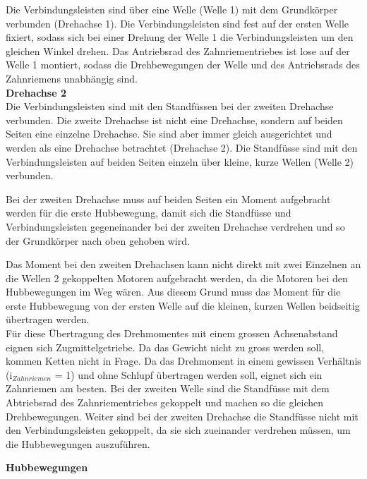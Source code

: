 Die Verbindungsleisten sind über eine Welle (Welle 1) mit dem Grundkörper verbunden (Drehachse 1). Die Verbindungsleisten sind fest auf der ersten Welle fixiert, sodass sich bei einer Drehung der Welle 1 die Verbindungsleisten um den gleichen Winkel drehen. Das Antriebsrad des Zahnriementriebes ist lose auf der Welle 1 montiert, sodass die Drehbewegungen der Welle und des Antriebsrads des Zahnriemens unabhängig sind.\\

\textbf{Drehachse 2}\\

Die Verbindungsleisten sind mit den Standfüssen bei der zweiten Drehachse verbunden. Die zweite Drehachse ist nicht eine Drehachse, sondern auf beiden Seiten eine einzelne Drehachse. Sie sind aber immer gleich ausgerichtet und werden als eine Drehachse betrachtet (Drehachse 2). Die Standfüsse sind mit den Verbindungsleisten auf beiden Seiten einzeln über kleine, kurze Wellen (Welle 2) verbunden. 

Bei der zweiten Drehachse muss auf beiden Seiten ein Moment aufgebracht werden für die erste Hubbewegung, damit sich die Standfüsse und Verbindungsleisten gegeneinander bei der zweiten Drehachse verdrehen und so der Grundkörper nach oben gehoben wird.

Das Moment bei den zweiten Drehachsen kann nicht direkt mit zwei Einzelnen an die Wellen 2 gekoppelten Motoren aufgebracht werden, da die Motoren bei den Hubbewegungen im Weg wären. Aus diesem Grund muss das Moment für die erste Hubbewegung von der ersten Welle auf die kleinen, kurzen Wellen beidseitig übertragen werden.\\

Für diese Übertragung des Drehmomentes mit einem grossen Achsenabstand eignen sich Zugmittelgetriebe. Da das Gewicht nicht zu gross werden soll, kommen Ketten nicht in Frage. Da das Drehmoment in einem gewissen Verhältnis (i$_{Zahnriemen}$ = 1) und ohne Schlupf übertragen werden soll, eignet sich ein Zahnriemen am besten. Bei der zweiten Welle sind die Standfüsse mit dem Abtriebsrad des Zahnriementriebes gekoppelt und machen so die gleichen Drehbewegungen. Weiter sind bei der zweiten Drehachse die Standfüsse nicht mit den Verbindungsleisten gekoppelt, da sie sich zueinander verdrehen müssen, um die Hubbewegungen auszuführen.

\newpage

\textbf{Hubbewegungen}\\

